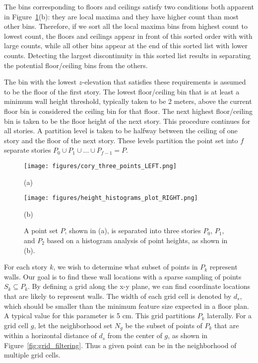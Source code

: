 \documentclass[10pt,twocolumn,letterpaper]{article}
\begin{document}
The bins corresponding to floors and ceilings satisfy two conditions both apparent in Figure~\ref{fig:height_histograms_plot}(b): they are local maxima and they have higher count than most other bins. Therefore, if we sort all the local maxima bins from highest count to lowest count, the floors and ceilings appear in front of this sorted order with with large counts, while all other bins appear at the end of this sorted list with lower counts. Detecting the largest discontinuity in this sorted list results in separating the potential floor/ceiling bins from the others.

The bin with the lowest $z$-elevation that satisfies these requirements is assumed to be the floor of the first story.  The lowest floor/ceiling bin that is at least a minimum wall height threshold, typically taken to be 2 meters, above the current floor bin is considered the ceiling bin for that floor.  The next highest floor/ceiling bin is taken to be the floor height of the next story.  This procedure continues for all stories.  A partition level is taken to be halfway between the ceiling of one story and the floor of the next story.  These levels partition the point set into $f$ separate stories $P_0 \cup P_1 \cup ... \cup P_{f-1} = P$.

\begin{figure}[t]

\begin{minipage}[b]{0.65\linewidth}
  \centering
  \centerline{\texttt{[image: figures/cory\_three\_points\_LEFT.png]}}
  \centerline{(a)}\medskip
\end{minipage}
\hfill
\begin{minipage}[b]{0.25\linewidth}
  \centering
  \centerline{\texttt{[image: figures/height\_histograms\_plot\_RIGHT.png]}}
  \centerline{(b)}\medskip
\end{minipage}

\caption{A point set $P$, shown in (a), is separated into three stories $P_0$, $P_1$, and $P_2$ based on a histogram analysis of point heights, as shown in (b).}
\label{fig:height_histograms_plot}

\end{figure}

For each story $k$, we wish to determine what subset of points in $P_k$ represent walls.  Our goal is to find these wall locations with a sparse sampling of points $S_k \subseteq P_k$.  By defining a grid along the x-y plane, we can find coordinate locations that are likely to represent walls.  The width of each grid cell is denoted by $d_s$, which should be smaller than the minimum feature size expected in a floor plan.  A typical value for this parameter is 5 cm.  This grid partitions $P_k$ laterally.  For a grid cell $g$, let the neighborhood set $N_g$ be the subset of points of $P_k$ that are within a horizontal distance of $d_s$ from the center of $g$, as shown in Figure~\ref{fig:grid_filtering}.  Thus a given point can be in the neighborhood of multiple grid cells.
\end{document}
